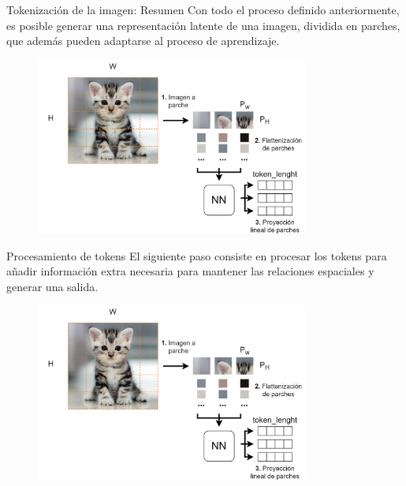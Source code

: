 \begin{frame}{Tokenización de la imagen: Resumen}
Con todo el proceso definido anteriormente, es posible generar una \alert{representación latente} de una imagen, dividida en parches, que además pueden adaptarse al proceso de \alert{aprendizaje}. 

\begin{figure}
    \centering
    \includegraphics[width=0.8\textwidth]{figures/Vision_Transformers/Image_Tokenization_Process.png}
\end{figure}
\end{frame}

\begin{frame}{Procesamiento de tokens}
El siguiente paso consiste en procesar los tokens para añadir \alert{información extra} necesaria para mantener las relaciones espaciales y generar una salida.

\begin{figure}
    \centering
    \includegraphics[width=0.8\textwidth]{figures/Vision_Transformers/Image_Tokenization_Process.png}
\end{figure}
\end{frame}


